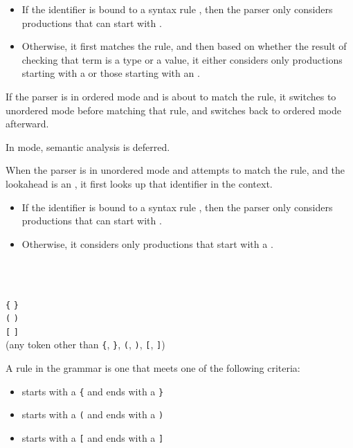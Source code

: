 \begin{itemize}
\item If the identifier is bound to a syntax rule , then the parser only considers productions that can start with .
\item Otherwise, it first matches the  rule, and then based on whether the result of checking that term is a type or a value, it either considers only productions starting with a  or those starting with an .
\end{itemize}

If the parser is in ordered mode and is about to match the  rule, it switches to unordered mode before matching that rule, and switches back to ordered mode afterward.


In  mode, semantic analysis is deferred.

When the parser is in unordered mode and attempts to match the  rule, and the lookahead is an , it first looks up that identifier in the context.

\begin{itemize}
\item If the identifier is bound to a syntax rule , then the parser only considers productions that can start with .
\item Otherwise, it considers only productions that start with a .
\end{itemize}
    
\begin{Syntax}
 \\
    \SynStar

 \\
    \lstinline|{|  \lstinline|}| \\
    \SynOr \lstinline|(|  \lstinline|)| \\
    \SynOr \lstinline|[|  \lstinline|]| \\
    \SynOr \SynComment(any token other than \lstinline|{|, \lstinline|}|, \lstinline|(|, \lstinline|)|, \lstinline|[|, \lstinline|]|)
\end{Syntax}

A  rule in the grammar is one that meets one of the following criteria:
\begin{itemize}
\item starts with a \lstinline|{| and ends with a \lstinline|}|
\item starts with a \lstinline|(| and ends with a \lstinline|)|
\item starts with a \lstinline|[| and ends with a \lstinline|]|
\end{itemize}

